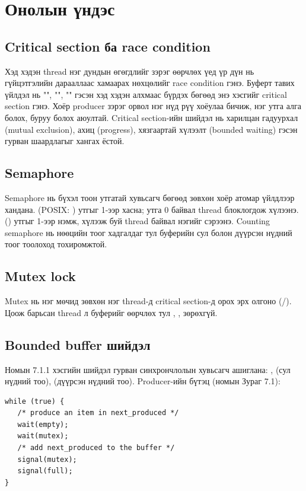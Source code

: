 \documentclass[12pt,a4paper]{article}
\begin{document}
\section{Онолын үндэс}

\subsection{Critical section ба race condition}
Хэд хэдэн thread нэг дундын өгөгдлийг зэрэг өөрчлөх үед үр дүн нь гүйцэтгэлийн дарааллаас хамаарах нөхцөлийг race condition гэнэ. Буферт тавих үйлдэл нь "", "", "" гэсэн хэд хэдэн алхмаас бүрдэх бөгөөд энэ хэсгийг critical section гэнэ. Хоёр producer зэрэг орвол нэг нүд рүү хоёулаа бичиж, нэг утга алга болох,  буруу болох аюултай. Critical section-ийн шийдэл нь харилцан гадуурхал (mutual exclusion), ахиц (progress), хязгаартай хүлээлт (bounded waiting) гэсэн гурван шаардлагыг хангах ёстой.

\subsection{Semaphore}
Semaphore нь бүхэл тоон утгатай хувьсагч бөгөөд зөвхөн хоёр атомар үйлдлээр хандана.  (POSIX: ) утгыг 1-ээр хасна; утга 0 байвал thread блоклогдож хүлээнэ.  () утгыг 1-ээр нэмж, хүлээж буй thread байвал нэгийг сэрээнэ. Counting semaphore нь нөөцийн тоог хадгалдаг тул буферийн сул болон дүүрсэн нүдний тоог тоолоход тохиромжтой.

\subsection{Mutex lock}
Mutex нь нэг мөчид зөвхөн нэг thread-д critical section-д орох эрх олгоно (/). Цоож барьсан thread л буферийг өөрчлөх тул , ,  зөрөхгүй.

\subsection{Bounded buffer шийдэл}
Номын 7.1.1 хэсгийн шийдэл гурван синхрончлолын хувьсагч ашиглана: ,  (сул нүдний тоо),  (дүүрсэн нүдний тоо). Producer-ийн бүтэц (номын Зураг 7.1):

\begin{lstlisting}[title={\textbf{Код 1.} Producer-ийн бүтэц (номын Зураг 7.1)}]
while (true) {
   /* produce an item in next_produced */
   wait(empty);
   wait(mutex);
   /* add next_produced to the buffer */
   signal(mutex);
   signal(full);
}
\end{lstlisting}
\end{document}

